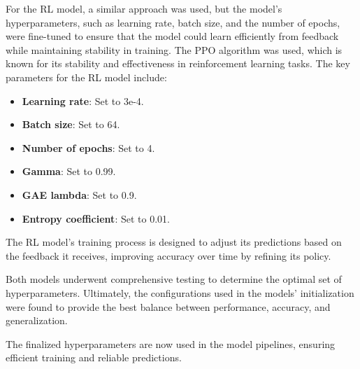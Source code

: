 For the \gls{RL} model, a similar approach was used, but the model's hyperparameters, such as learning rate, batch size, and the number of epochs, were fine-tuned to ensure that the model could learn efficiently from feedback while maintaining stability in training. 
The PPO algorithm was used, which is known for its stability and effectiveness in reinforcement learning tasks. 
The key parameters for the \gls{RL} model include:

\begin{itemize}
    \item \textbf{Learning rate}: Set to 3e-4.
    \item \textbf{Batch size}: Set to 64.
    \item \textbf{Number of epochs}: Set to 4.
    \item \textbf{Gamma}: Set to 0.99.
    \item \textbf{GAE lambda}: Set to 0.9.
    \item \textbf{Entropy coefficient}: Set to 0.01.
\end{itemize}

The \gls{RL} model's training process is designed to adjust its predictions based on the feedback it receives, improving accuracy over time by refining its policy.

Both models underwent comprehensive testing to determine the optimal set of hyperparameters. Ultimately, the configurations used in the models' initialization were found to provide the best balance between performance, accuracy, and generalization.

The finalized hyperparameters are now used in the model pipelines, ensuring efficient training and reliable predictions.
